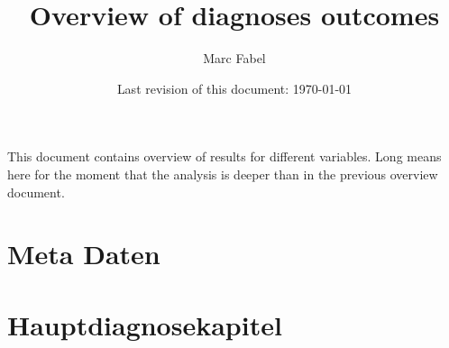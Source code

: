 \documentclass{scrartcl} %
\author{Marc Fabel}
\title{Overview of diagnoses outcomes}
\date{Last revision of this document: \today}
\begin{document}
\maketitle
This document contains overview of results for different variables. Long means here for the moment that the analysis is deeper than in the previous overview document.

\newpage


\section{Meta Daten}









\section{Hauptdiagnosekapitel}


























\end{document}
